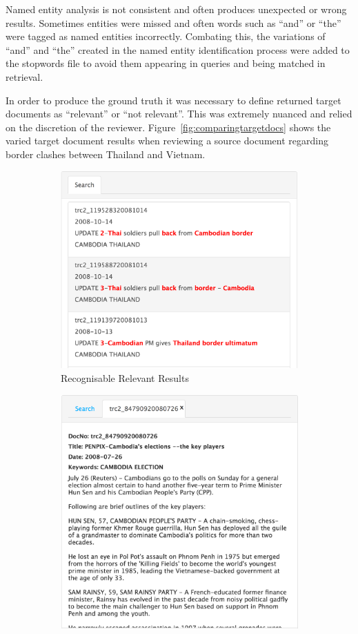 \documentclass{l4proj}
\begin{document}
Named entity analysis is not consistent and often produces unexpected or wrong results. Sometimes entities were missed and often words such as ``and'' or ``the'' were tagged as named entities incorrectly. Combating this, the variations of ``and'' and ``the'' created in the named entity identification process were added to the stopwords file to avoid them appearing in queries and being matched in retrieval.

In order to produce the ground truth it was necessary to define returned target documents as ``relevant'' or ``not relevant''. This was extremely nuanced and relied on the discretion of the reviewer. Figure~\ref{fig:comparingtargetdocs} shows the varied target document results when reviewing a source document regarding border clashes between Thailand and Vietnam.
\begin{figure}[H]
\centering
\begin{subfigure}{.5\textwidth}
  \centering
  \includegraphics[width=.9\linewidth]{images/good_results}
  \caption{Recognisable Relevant Results}
  \label{relevant_results}
\end{subfigure}%
\begin{subfigure}{.5\textwidth}
  \centering
  \includegraphics[width=.9\linewidth]{images/bad_result}

\end{subfigure}
\end{figure}
\end{document}
